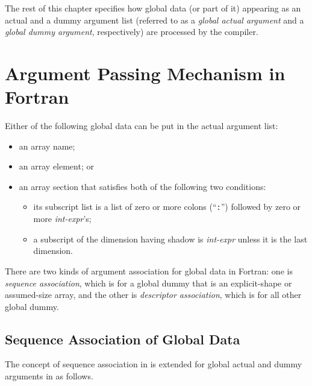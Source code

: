 \vspace{1.5zw}

\hspace{-1.2\parindent}
The rest of this chapter specifies how global data (or part of it)
appearing as an actual and a dummy argument list (referred to as a {\it
global actual argument} and a {\it global dummy argument}, respectively)
are processed by the {\XMP} compiler.


\section{Argument Passing Mechanism in {\XMP} Fortran}


Either of the following global data can be put in the actual argument list:

\begin{itemize}
 \item an array name;
 \item an array element; or
 \item an array section that satisfies both of the following two
       conditions:
       \begin{itemize}
	\item its subscript list is a list of zero or more colons
	      (``{\tt :}'') followed by zero or more {\it int-expr}'s;
	\item a subscript of the dimension having shadow is {\it
	      int-expr} unless it is the last dimension.
       \end{itemize}
\end{itemize}

There are two kinds of argument association for global data in {\XMP}
Fortran: one is {\it sequence association}, which is for a global dummy
that is an explicit-shape or assumed-size array, and the other is
{\it descriptor association}, which is for all other global dummy.


\subsection{Sequence Association of Global Data}

The concept of sequence association in {\Fort} is extended for global
actual and dummy arguments in {\XMP} as follows.

